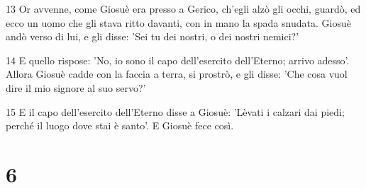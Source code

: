 \par 13 Or avvenne, come Giosuè era presso a Gerico, ch'egli alzò gli occhi, guardò, ed ecco un uomo che gli stava ritto davanti, con in mano la spada snudata. Giosuè andò verso di lui, e gli disse: 'Sei tu dei nostri, o dei nostri nemici?'
\par 14 E quello rispose: 'No, io sono il capo dell'esercito dell'Eterno; arrivo adesso'. Allora Giosuè cadde con la faccia a terra, si prostrò, e gli disse: 'Che cosa vuol dire il mio signore al suo servo?'
\par 15 E il capo dell'esercito dell'Eterno disse a Giosuè: 'Lèvati i calzari dai piedi; perché il luogo dove stai è santo'. E Giosuè fece così.

\chapter{6}

